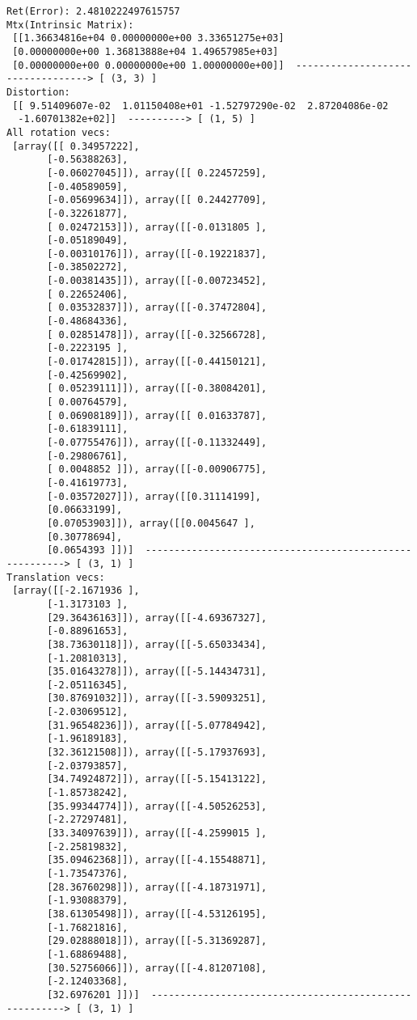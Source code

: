 \documentclass[11pt]{article}
\begin{document}
    \begin{Verbatim}[commandchars=\\\{\}]
Ret(Error): 2.4810222497615757
Mtx(Intrinsic Matrix):
 [[1.36634816e+04 0.00000000e+00 3.33651275e+03]
 [0.00000000e+00 1.36813888e+04 1.49657985e+03]
 [0.00000000e+00 0.00000000e+00 1.00000000e+00]]  ----------------------------------> [ (3, 3) ]
Distortion:
 [[ 9.51409607e-02  1.01150408e+01 -1.52797290e-02  2.87204086e-02
  -1.60701382e+02]]  ----------> [ (1, 5) ]
All rotation vecs:
 [array([[ 0.34957222],
       [-0.56388263],
       [-0.06027045]]), array([[ 0.22457259],
       [-0.40589059],
       [-0.05699634]]), array([[ 0.24427709],
       [-0.32261877],
       [ 0.02472153]]), array([[-0.0131805 ],
       [-0.05189049],
       [-0.00310176]]), array([[-0.19221837],
       [-0.38502272],
       [-0.00381435]]), array([[-0.00723452],
       [ 0.22652406],
       [ 0.03532837]]), array([[-0.37472804],
       [-0.48684336],
       [ 0.02851478]]), array([[-0.32566728],
       [-0.2223195 ],
       [-0.01742815]]), array([[-0.44150121],
       [-0.42569902],
       [ 0.05239111]]), array([[-0.38084201],
       [ 0.00764579],
       [ 0.06908189]]), array([[ 0.01633787],
       [-0.61839111],
       [-0.07755476]]), array([[-0.11332449],
       [-0.29806761],
       [ 0.0048852 ]]), array([[-0.00906775],
       [-0.41619773],
       [-0.03572027]]), array([[0.31114199],
       [0.06633199],
       [0.07053903]]), array([[0.0045647 ],
       [0.30778694],
       [0.0654393 ]])]  --------------------------------------------------------> [ (3, 1) ]
Translation vecs:
 [array([[-2.1671936 ],
       [-1.3173103 ],
       [29.36436163]]), array([[-4.69367327],
       [-0.88961653],
       [38.73630118]]), array([[-5.65033434],
       [-1.20810313],
       [35.01643278]]), array([[-5.14434731],
       [-2.05116345],
       [30.87691032]]), array([[-3.59093251],
       [-2.03069512],
       [31.96548236]]), array([[-5.07784942],
       [-1.96189183],
       [32.36121508]]), array([[-5.17937693],
       [-2.03793857],
       [34.74924872]]), array([[-5.15413122],
       [-1.85738242],
       [35.99344774]]), array([[-4.50526253],
       [-2.27297481],
       [33.34097639]]), array([[-4.2599015 ],
       [-2.25819832],
       [35.09462368]]), array([[-4.15548871],
       [-1.73547376],
       [28.36760298]]), array([[-4.18731971],
       [-1.93088379],
       [38.61305498]]), array([[-4.53126195],
       [-1.76821816],
       [29.02888018]]), array([[-5.31369287],
       [-1.68869488],
       [30.52756066]]), array([[-4.81207108],
       [-2.12403368],
       [32.6976201 ]])]  -------------------------------------------------------> [ (3, 1) ]

    \end{Verbatim}
\end{document}
